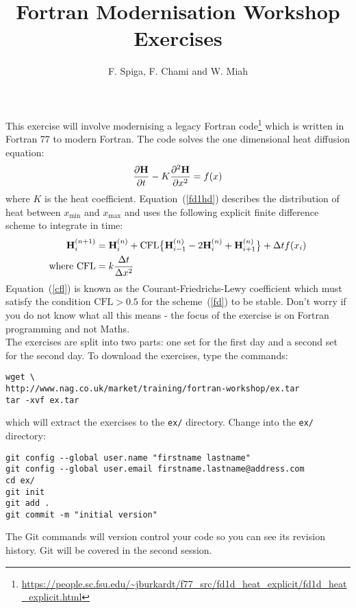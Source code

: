 \documentclass[12pt]{article}
\begin{document}
 
 
 
\title{\bf Fortran Modernisation Workshop \\ Exercises}
\author{F. Spiga, F. Chami and W. Miah}
 
\maketitle

This exercise will involve modernising a legacy Fortran code\footnote{\url{https://people.sc.fsu.edu/~jburkardt/f77_src/fd1d_heat_explicit/fd1d_heat_explicit.html}} which is written 
in Fortran 77 to modern Fortran. The code solves the one dimensional heat
diffusion equation:
\begin{equation} \label{fd1hd}
\frac{\partial{\bf H}}{\partial t} - K\frac{\partial^{2}{\bf H}}{\partial x^{2}} = f(x)
\end{equation}
where $K$ is the heat coefficient. Equation~(\ref{fd1hd}) describes the distribution of heat 
between $x_{\text{min}}$ and $x_{\text{max}}$ and uses the following explicit finite difference 
scheme to integrate in time:
\begin{align}
{\bf H}^{(n+1)}_{i} & = {\bf H}^{(n)}_{i} + \text{CFL}\big\{{\bf H}^{(n)}_{i-1}-2{\bf H}^{(n)}_{i} +
                      {\bf H}^{(n)}_{i+1}\big\} + \Delta t f(x_{i}) \label{fd} \\
            \text{where CFL} & = k\frac{\Delta t}{\Delta x^{2}} \label{cfl}
\end{align}
Equation~(\ref{cfl}) is known as the Courant-Friedrichs-Lewy coefficient which must satisfy
the condition $\text{CFL} > 0.5$ for the scheme~(\ref{fd}) to be stable. Don't worry if you do 
not know what all this means - the focus of the exercise is on Fortran programming and not
Maths. \\

The exercises are split into two parts: one set for the first day and a second
set for the second day. To download the exercises, type the commands:
\begin{verbatim}
wget \
http://www.nag.co.uk/market/training/fortran-workshop/ex.tar
tar -xvf ex.tar
\end{verbatim}
which will extract the exercises to the \texttt{ex/} directory. Change into the 
\texttt{ex/} directory:
\begin{verbatim}
git config --global user.name "firstname lastname"
git config --global user.email firstname.lastname@address.com
cd ex/
git init
git add .
git commit -m "initial version"
\end{verbatim}
The Git commands will version control your code so you can see its revision history. Git will
be covered in the second session. \\
\end{document}
